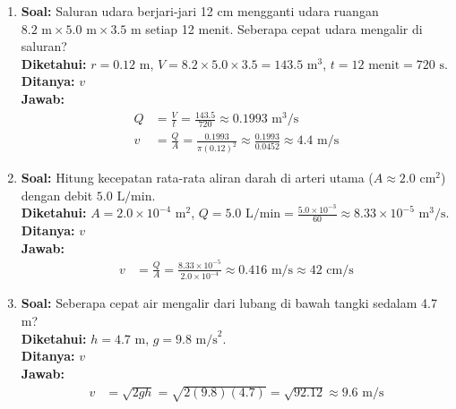 \documentclass[twocolumn]{article}
\begin{document}
\begin{enumerate}
    \item \textbf{Soal:} Saluran udara berjari-jari 12 cm mengganti udara ruangan $8.2 \text{ m} \times 5.0 \text{ m} \times 3.5 \text{ m}$ setiap 12 menit. Seberapa cepat udara mengalir di saluran? \\
    \textbf{Diketahui:} $r = 0.12 \text{ m}$, $V = 8.2 \times 5.0 \times 3.5 = 143.5 \text{ m}^3$, $t = 12 \text{ menit} = 720 \text{ s}$. \\
    \textbf{Ditanya:} $v$ \\
    \textbf{Jawab:}
    \begin{align*}
        Q &= \frac{V}{t} = \frac{143.5}{720} \approx 0.1993 \text{ m}^3/\text{s} \\
        v &= \frac{Q}{A} = \frac{0.1993}{\pi (0.12)^2} \approx \frac{0.1993}{0.0452} \approx 4.4 \text{ m/s}
    \end{align*}

    \item \textbf{Soal:} Hitung kecepatan rata-rata aliran darah di arteri utama ($A \approx 2.0 \text{ cm}^2$) dengan debit $5.0 \text{ L/min}$. \\
    \textbf{Diketahui:} $A = 2.0 \times 10^{-4} \text{ m}^2$, $Q = 5.0 \text{ L/min} = \frac{5.0 \times 10^{-3}}{60} \approx 8.33 \times 10^{-5} \text{ m}^3/\text{s}$. \\
    \textbf{Ditanya:} $v$ \\
    \textbf{Jawab:}
    \begin{align*}
        v &= \frac{Q}{A} = \frac{8.33 \times 10^{-5}}{2.0 \times 10^{-4}} \approx 0.416 \text{ m/s} \approx 42 \text{ cm/s}
    \end{align*}

    \item \textbf{Soal:} Seberapa cepat air mengalir dari lubang di bawah tangki sedalam 4.7 m? \\
    \textbf{Diketahui:} $h = 4.7 \text{ m}$, $g = 9.8 \text{ m/s}^2$. \\
    \textbf{Ditanya:} $v$ \\
    \textbf{Jawab:}
    \begin{align*}
        v &= \sqrt{2gh} = \sqrt{2(9.8)(4.7)} = \sqrt{92.12} \approx 9.6 \text{ m/s}
    \end{align*}


\end{enumerate}
\end{document}
